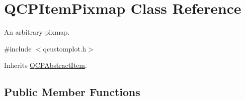 \hypertarget{class_q_c_p_item_pixmap}{\section{Q\-C\-P\-Item\-Pixmap Class Reference}
\label{class_q_c_p_item_pixmap}
}


An arbitrary pixmap.  




{\ttfamily \#include $<$qcustomplot.\-h$>$}



Inherits \hyperlink{class_q_c_p_abstract_item}{Q\-C\-P\-Abstract\-Item}.

\subsection*{Public Member Functions}
